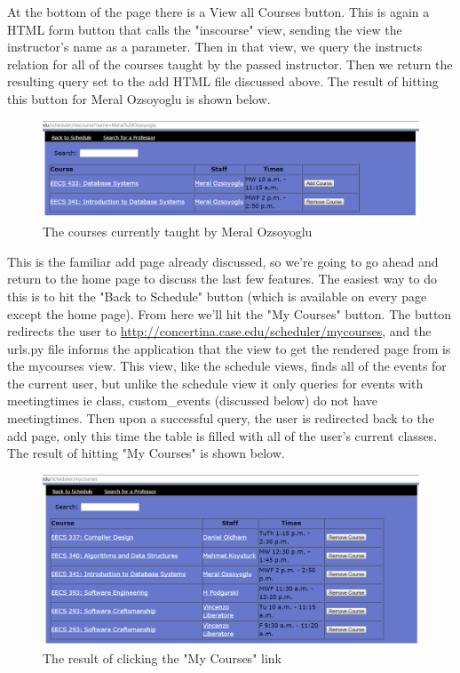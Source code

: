 \documentclass[pdftex,12pt,letter]{article}
\begin{document}
At the bottom of the page there is a View all Courses button. This is again a HTML form button that calls the "inscourse" view, sending the view the instructor's name as a parameter. Then in that view, we query the instructs relation for all of the courses taught by the passed instructor. Then we return the resulting query set to the add HTML file discussed above. The result of hitting this button for Meral Ozsoyoglu is shown below.
\begin{figure}
\includegraphics[width=6in]{meralCourses.png}
\caption{The courses currently taught by Meral Ozsoyoglu}
\end{figure}
\FloatBarrier

This is the familiar add page already discussed, so we're going to go ahead and return to the home page to discuss the last few features. The easiest way to do this is to hit the "Back to Schedule" button (which is available on every page except the home page). From here we'll hit the "My Courses" button. The button redirects the user to \url{http://concertina.case.edu/scheduler/mycourses}, and the urls.py file informs the application that the view to get the rendered page from is the mycourses view. This view, like the schedule views, finds all of the events for the current user, but unlike the schedule view it only queries for events with meetingtimes ie class, custom\_events (discussed below) do not have meetingtimes. Then upon a successful query, the user is redirected back to the add page, only this time the table is filled with all of the user's current classes. The result of hitting "My Courses" is shown below.
\begin{figure}
\includegraphics[width=6in]{mycourses.png}
\caption{The result of clicking the "My Courses" link}
\end{figure}
\FloatBarrier
\end{document}

